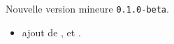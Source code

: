 Nouvelle version mineure \verb+0.1.0-beta+. 
    
\begin{itemize}[itemsep=.5em]
    \item {} ajout de ,  et .
\end{itemize}

\separation
